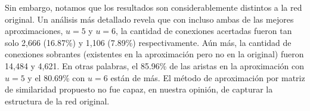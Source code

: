 Sin embargo, notamos que los resultados son considerablemente distintos a la red original. Un análisis más detallado revela que con incluso ambas de las mejores aproximaciones, $u = 5$ y $u = 6$, la cantidad de conexiones acertadas fueron tan solo 2,666 (16.87\%) y 1,106 (7.89\%) respectivamente. Aún más, la cantidad de conexiones sobrantes (existentes en la aproximación pero no en la original) fueron 14,484 y 4,621. En otras palabras, el 85.96\% de las aristas en la aproximación con $u = 5$ y el 80.69\% con $u = 6$ están de más. El método de aproximación por matriz de similaridad propuesto no fue capaz, en nuestra opinión, de capturar la estructura de la red original. 






